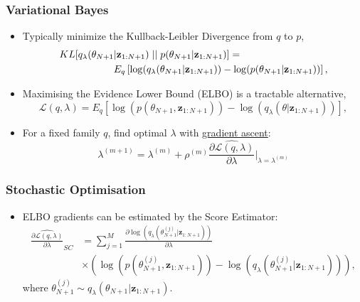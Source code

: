 \documentclass[11pt]{beamer}\usepackage[]{graphicx}\usepackage[]{color}
\begin{document}
\begin{frame}[label=VB]
\frametitle{Variational Bayes}
\begin{itemize}
\item Typically minimize the Kullback-Leibler Divergence from $q$ to $p$,
\begin{align*}
\label{KL-def}
KL[q_{\lambda}(\theta_{N+1} &| \textbf{z}_{1:N+1})\hspace{.1cm}||\hspace{.1cm}p(\theta_{N+1} | \textbf{z}_{1:N+1})] = \\
&E_q \left[ \log(q_{\lambda}(\theta_{N+1} | \textbf{z}_{1:N+1})) - \log(p(\theta_{N+1} | \textbf{z}_{1:N+1})) \right],
\end{align*}
\item Maximising the Evidence Lower Bound (ELBO) is a tractable alternative, $$\mathcal{L}(q, \lambda) = E_{q} \left[\log(p(\theta_{N+1}, \textbf{z}_{1:N+1})) - \log(q_{\lambda}(\theta | \textbf{z}_{1:N+1}))\right],$$
\pause
\item For a fixed family $q$, find optimal $\lambda$ with \hyperlink{SGA}{gradient ascent}:
\begin{equation*}
\lambda^{(m+1)} = \lambda^{(m)} + \rho^{(m)} \widehat{\frac{\partial\mathcal{L}(q, \lambda)}{\partial \lambda}} \bigg\rvert_{\lambda = \lambda^{(m)}}
\end{equation*}
\end{itemize}
\end{frame}

\begin{frame}
\frametitle{Stochastic Optimisation}
\begin{itemize}
\item ELBO gradients can be estimated by the Score Estimator:
\begin{align*}
\widehat{\frac{\partial\mathcal{L}(q, \lambda)}{\partial \lambda}}_{SC} &= \sum_{j = 1}^M \frac{\partial \log(q_{\lambda}(\theta_{N+1}^{(j)} | \textbf{z}_{1:N+1}))}{\partial \lambda}  \\
&\times \left(\log(p(\theta_{N+1}^{(j)}, \textbf{z}_{1:N+1})) - \log(q_{\lambda}(\theta_{N+1}^{(j)} | \textbf{z}_{1:N+1})) \right),
\end{align*}
where $\theta_{N+1}^{(j)} \sim q_{\lambda}(\theta_{N+1} | \textbf{z}_{1:N+1})$.
\end{itemize}
\end{frame}
\end{document}
